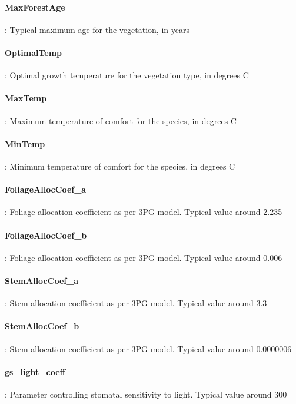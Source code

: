 \hangindent=0.7cm
\paragraph{MaxForestAge}:  Typical maximum age for the vegetation, in years

\hangindent=0.7cm
\paragraph{OptimalTemp}: Optimal growth temperature for the vegetation type, in degrees C

\hangindent=0.7cm
\paragraph{MaxTemp}: Maximum temperature of comfort for the species, in degrees C

\hangindent=0.7cm
\paragraph{MinTemp}: Minimum temperature of comfort for the species, in degrees C

\hangindent=0.7cm
\paragraph{FoliageAllocCoef\_a}: Foliage allocation coefficient as per 3PG model. Typical value around 2.235 	

\hangindent=0.7cm
\paragraph{FoliageAllocCoef\_b}: Foliage allocation coefficient as per 3PG model. Typical value around 0.006 	

\hangindent=0.7cm
\paragraph{StemAllocCoef\_a}: Stem allocation coefficient as per 3PG model. Typical value around 3.3 	

\hangindent=0.7cm
\paragraph{StemAllocCoef\_b}: Stem allocation coefficient as per 3PG model. Typical value around 0.0000006 	

\hangindent=0.7cm
\paragraph{gs\_light\_coeff}: Parameter controlling stomatal sensitivity to light. Typical value around 300

